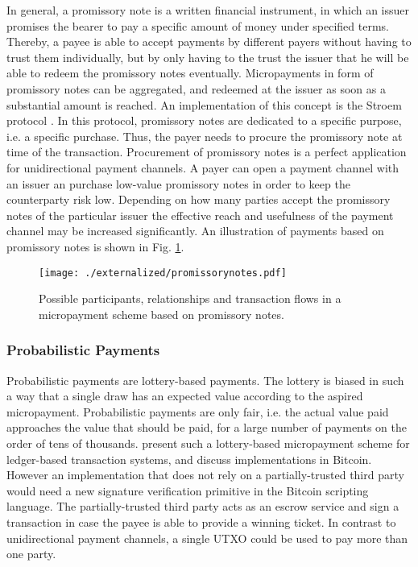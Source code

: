In general, a promissory note is a written financial instrument, in which an issuer promises the bearer to pay a specific amount of money under specified terms. Thereby, a payee is able to accept payments by different payers without having to trust them individually, but by only having to the trust the issuer that he will be able to redeem the promissory notes eventually. Micropayments in form of promissory notes can be aggregated, and redeemed at the issuer as soon as a substantial amount is reached. An implementation of this concept is the Stroem protocol \parencite{strawpay}. In this protocol, promissory notes are dedicated to a specific purpose, i.e. a specific purchase. Thus, the payer needs to procure the promissory note at time of the transaction. Procurement of promissory notes is a perfect application for unidirectional payment channels. A payer can open a payment channel with an issuer an purchase low-value promissory notes in order to keep the counterparty risk low. Depending on how many parties accept the promissory notes of the particular issuer the effective reach and usefulness of the payment channel may be increased significantly. An illustration of payments based on promissory notes is shown in Fig. \ref{fig:promissorynotes}.

\begin{figure}
\centering
\texttt{[image: ./externalized/promissorynotes.pdf]}
\caption{Possible participants, relationships and transaction flows in a micropayment scheme based on promissory notes.}
\label{fig:promissorynotes}
\end{figure}

\subsubsection{Probabilistic Payments}

Probabilistic payments \parencite{wheeler1996transactions,rivest1996payword,rivest1997electronic} are lottery-based payments. The lottery is biased in such a way that a single draw has an expected value according to the aspired micropayment. Probabilistic payments are only fair, i.e. the actual value paid approaches the value that should be paid, for a large number of payments on the order of tens of thousands. 
\cite{Pass:2015:MDC:2810103.2813713} present such a lottery-based micropayment scheme for ledger-based transaction systems, and discuss implementations in Bitcoin. However an implementation that does not rely on a partially-trusted third party would need a new signature verification primitive in the Bitcoin scripting language. The partially-trusted third party acts as an escrow service and sign a transaction in case the payee is able to provide a winning ticket. In contrast to unidirectional payment channels, a single UTXO could be used to pay more than one party.


